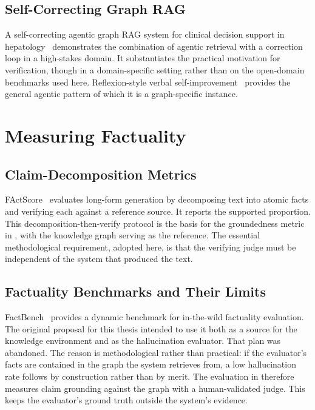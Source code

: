 \subsection{Self-Correcting Graph RAG}

A self-correcting agentic graph RAG system for clinical decision support in
hepatology~\cite{hu2025selfcorrecting} demonstrates the combination of agentic
retrieval with a correction loop in a high-stakes domain. It substantiates the
practical motivation for verification, though in a domain-specific setting
rather than on the open-domain benchmarks used here. Reflexion-style verbal
self-improvement~\cite{shinn2023reflexion} provides the general agentic pattern
of which it is a graph-specific instance.

\section{Measuring Factuality}\label{sec:factuality-related}

\subsection{Claim-Decomposition Metrics}

FActScore~\cite{min2023factscore} evaluates long-form generation by
decomposing text into atomic facts and verifying each
against a reference source. It reports the supported proportion. This
decomposition-then-verify protocol is the basis for the groundedness metric in
, with the knowledge graph serving as the
reference. The essential methodological requirement, adopted here, is that the
verifying judge must be independent of the system that produced the text.

\subsection{Factuality Benchmarks and Their Limits}

FactBench~\cite{bayat2025factbench} provides a dynamic benchmark for in-the-wild
factuality evaluation. The original proposal for this thesis intended to use it
both as a source for the knowledge environment and as the hallucination
evaluator. That plan was abandoned. The reason is methodological rather than
practical: if the evaluator's facts are contained in the graph the system
retrieves from, a low hallucination rate follows by construction rather than by
merit. The evaluation in  therefore measures claim grounding
against the graph with a human-validated judge. This keeps the evaluator's
ground truth outside the system's evidence.

